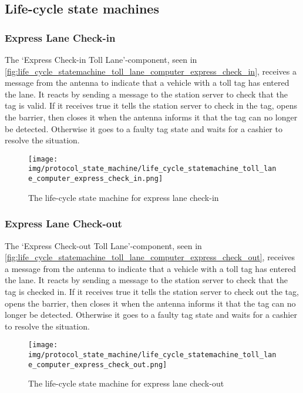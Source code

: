 \subsection*{Life-cycle state machines}
\subsubsection*{Express Lane Check-in}
The ‘Express Check-in Toll Lane’-component, seen in \autoref{fig:life_cycle_statemachine_toll_lane_computer_express_check_in}, receives a message from the antenna to indicate that a vehicle with a toll tag has entered the lane. It reacts by sending a message to the station server to check that the tag is valid. If it receives true it tells the station server to check in the tag, opens the barrier, then closes it when the antenna informs it that the tag can no longer be detected.  Otherwise it goes to a faulty tag state and waits for a cashier to resolve the situation. 
\begin{figure}
\centering
\texttt{[image: img/protocol\_state\_machine/life\_cycle\_statemachine\_toll\_lane\_computer\_express\_check\_in.png]}
\caption{The life-cycle state machine for express lane check-in}
\label{fig:life_cycle_statemachine_toll_lane_computer_express_check_in}
\end{figure}

\subsubsection*{Express Lane Check-out}
The ‘Express Check-out Toll Lane’-component, seen in \autoref{fig:life_cycle_statemachine_toll_lane_computer_express_check_out}, receives a message from the antenna to indicate that a vehicle with a toll tag has entered the lane. It reacts by sending a message to the station server to check that the tag is checked in. If it receives true it tells the station server to check out the tag, opens the barrier, then closes it when the antenna informs it that the tag can no longer be detected.  Otherwise it goes to a faulty tag state and waits for a cashier to resolve the situation. 
\begin{figure}
\centering
\texttt{[image: img/protocol\_state\_machine/life\_cycle\_statemachine\_toll\_lane\_computer\_express\_check\_out.png]}
\caption{The life-cycle state machine for express lane check-out}
\label{fig:life_cycle_statemachine_toll_lane_computer_express_check_out}
\end{figure}

